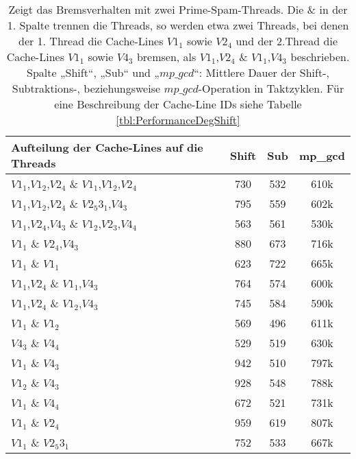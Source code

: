 \begin{table}[h]
\caption{Zeigt das Bremsverhalten mit zwei Prime-Spam-Threads. Die \& in der 1. Spalte trennen die Threads, so werden etwa zwei Threads, bei denen der 1. Thread die Cache-Lines $V1_1$ sowie $V2_4$ und der 2.Thread die Cache-Lines $V1_1$ sowie $V4_3$ bremsen, als $V1_1$,$V2_4$ \& $V1_1$,$V4_3$ beschrieben. Spalte „Shift“, „Sub“ und „$mp\_gcd$“: Mittlere Dauer der Shift-, Subtraktions-, beziehungsweise $mp\_gcd$-Operation in Taktzyklen. Für eine Beschreibung der Cache-Line IDs siehe Tabelle \ref{tbl:PerformanceDegShift}}
\label{tbl:PerformanceDegShiftMultithreadTwo}
\begin{tabular}{lccc}
\toprule
Aufteilung der Cache-Lines auf die Threads & Shift & Sub & mp\_gcd \\
\midrule
$V1_1$,$V1_2$,$V2_4$ \& $V1_1$,$V1_2$,$V2_4$                       & 730   & 532 & 610k    \\
$V1_1$,$V1_2$,$V2_4$ \& $V2_5 3_1$,$V4_3$                         & 795   & 559 & 602k    \\
$V1_1$,$V2_4$,$V4_3$ \& $V1_2$,$V2_3$,$V4_4$                     & 563   & 561 & 530k    \\
$V1_1$ \& $V2_4$,$V4_3$                               & 880   & 673 & 716k    \\
$V1_1$ \& $V1_1$                                   & 623   & 722 & 665k    \\
$V1_1$,$V2_4$ \& $V1_1$,$V4_3$                            & 764   & 574 & 600k    \\
$V1_1$,$V2_4$ \& $V1_2$,$V4_3$                            & 745   & 584 & 590k    \\
$V1_1$ \& $V1_2$                                   & 569   & 496 & 611k    \\
$V4_3$ \& $V4_4$                                 & 529   & 519 & 630k    \\
$V1_1$ \& $V4_3$                                  & 942   & 510 & 797k    \\
$V1_2$ \& $V4_3$                                  & 928   & 548 & 788k    \\
$V1_1$ \& $V4_4$                                  & 672   & 521 & 731k    \\
$V1_1$ \& $V2_4$                                   & 959   & 619 & 807k    \\
$V1_1$ \& $V2_5 3_1$                                   & 752   & 533 & 667k    \\
\bottomrule
\end{tabular}
\end{table}

